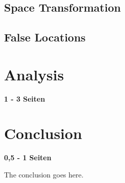 \documentclass[conference]{IEEEtran}
\begin{document}
\subsection{Space Transformation}



\subsection{False Locations}



\section{Analysis}
\textbf{1 - 3 Seiten}



\section{Conclusion}
\textbf{0,5 - 1 Seiten}

The conclusion goes here.





\end{document}
